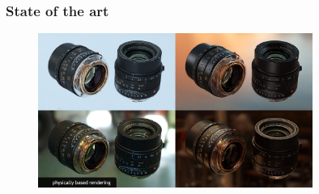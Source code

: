 \begin{frame}\frametitle{State of the art}
  \begin{figure}[ht]
    \includegraphics[width=0.8\textwidth]{pics/physicallyBasedRendering/pbr}
  \end{figure}
\end{frame}


